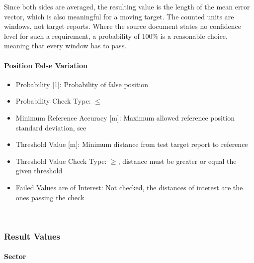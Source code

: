 Since both sides are averaged, the resulting value is the length of the mean error vector, which is also meaningful for a moving target. The counted units are windows, not target reports. Where the source document states no confidence level for such a requirement, a probability of 100\% is a reasonable choice, meaning that every window has to pass. \\

\paragraph{Position False Variation}

\begin{itemize}  
\item Probability [1]: Probability of false position
\item Probability Check Type: $\leq$
\item Minimum Reference Accuracy [m]: Maximum allowed reference position standard deviation, see 
\item Threshold Value [m]: Minimum distance from test target report to reference
\item Threshold Value Check Type: $\geq$, distance must be greater or equal the given threshold
\item Failed Values are of Interest: Not checked, the distances of interest are the ones passing the check
\end{itemize}
\ \\

\subsubsection{Result Values}

\paragraph{Sector}

